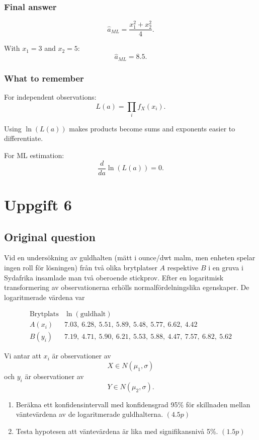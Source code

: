 \documentclass[10pt]{article}
\begin{document}
\subsubsection*{Final answer}

\[
\hat{a}_{ML}
=
\frac{x_1^2+x_2^2}{4}.
\]

With \(x_1=3\) and \(x_2=5\):
\[
\hat{a}_{ML}=8.5.
\]

\subsubsection*{What to remember}

For independent observations:
\[
L(a)=
\prod_i f_X(x_i).
\]

Using \(\ln(L(a))\) makes products become sums and
exponents easier to differentiate.

For ML estimation:
\[
\frac{d}{da}\ln(L(a))=0.
\]

\section*{Uppgift 6}

\subsection*{Original question}

Vid en undersökning av guldhalten (mätt i
ounce/dwt malm, men enheten spelar ingen roll för
lösningen) från två olika brytplatser \(A\)
respektive \(B\) i en gruva i Sydafrika insamlade
man två oberoende stickprov. Efter en logaritmisk
transformering av observationerna erhölls
normalfördelningslika egenskaper. De logaritmerade
värdena var

\[
\begin{array}{c|c}
\text{Brytplats} & \ln(\text{guldhalt})\\
\hline
A(x_i) &
7.03,\ 6.28,\ 5.51,\ 5.89,\ 5.48,\ 5.77,\ 6.62,\ 4.42\\
B(y_i) &
7.19,\ 4.71,\ 5.90,\ 6.21,\ 5.53,\ 5.88,\ 4.47,\ 7.57,\ 6.82,\ 5.62
\end{array}
\]

Vi antar att \(x_i\) är observationer av
\[
X\in N(\mu_1,\sigma)
\]
och \(y_i\) är observationer av
\[
Y\in N(\mu_2,\sigma).
\]

\begin{enumerate}[label=\alph*)]
\item Beräkna ett konfidensintervall med
konfidensgrad 95\% för skillnaden mellan
väntevärdena av de logaritmerade guldhalterna.
\((4.5p)\)

\item Testa hypotesen att väntevärdena är lika med
signifikansnivå 5\%. \((1.5p)\)
\end{enumerate}
\end{document}
